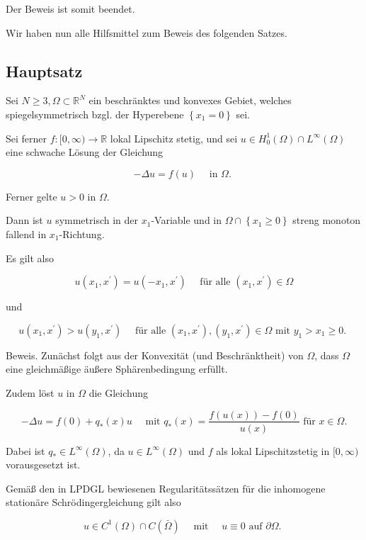 \documentclass[10pt, letterpaper]{article}
\begin{document}
Der Beweis ist somit beendet.

Wir haben nun alle Hilfsmittel zum Beweis des folgenden Satzes.

\subsection*{Hauptsatz}

Sei $N \geq 3, \Omega \subset \mathbb{R}^{N}$ ein beschränktes und konvexes Gebiet, welches spiegelsymmetrisch bzgl. der Hyperebene $\left\{x_{1}=0\right\}$ sei.

Sei ferner $f:[0, \infty) \rightarrow \mathbb{R}$ lokal Lipschitz stetig, und sei $u \in H_{0}^{1}(\Omega) \cap L^{\infty}(\Omega)$ eine schwache Lösung der Gleichung

$$
-\Delta u=f(u) \quad \text { in } \Omega \text {. }
$$

Ferner gelte $u>0$ in $\Omega$.

Dann ist $u$ symmetrisch in der $x_{1}$-Variable und in $\Omega \cap\left\{x_{1} \geq 0\right\}$ streng monoton fallend in $x_{1}$-Richtung.

Es gilt also

$$
u\left(x_{1}, x^{\prime}\right)=u\left(-x_{1}, x^{\prime}\right) \quad \text { für alle }\left(x_{1}, x^{\prime}\right) \in \Omega
$$

und

$$
u\left(x_{1}, x^{\prime}\right)>u\left(y_{1}, x^{\prime}\right) \quad \text { für alle }\left(x_{1}, x^{\prime}\right),\left(y_{1}, x^{\prime}\right) \in \Omega \text { mit } y_{1}>x_{1} \geq 0 \text {. }
$$

Beweis. Zunächst folgt aus der Konvexität (und Beschränktheit) von $\Omega$, dass $\Omega$ eine gleichmäßige äußere Sphärenbedingung erfüllt.

Zudem löst $u$ in $\Omega$ die Gleichung

$$
-\Delta u=f(0)+q_{*}(x) u \quad \text { mit } q_{*}(x)=\frac{f(u(x))-f(0)}{u(x)} \text { für } x \in \Omega .
$$

Dabei ist $q_{*} \in L^{\infty}(\Omega)$, da $u \in L^{\infty}(\Omega)$ und $f$ als lokal Lipschitzstetig in $[0, \infty)$ vorausgesetzt ist.

Gemäß den in LPDGL bewiesenen Regularitätssätzen für die inhomogene stationäre Schrödingergleichung gilt also

$$
u \in C^{1}(\Omega) \cap C(\bar{\Omega}) \quad \text { mit } \quad u \equiv 0 \text { auf } \partial \Omega \text {. }
$$
\end{document}
